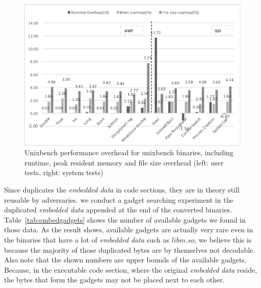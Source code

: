 \begin{figure}[h]
\begin{center}
\includegraphics[scale=0.52]{norax/figures/unixbench}
\caption{Unixbench performance overhead for unixbench binaries, including runtime, peak resident memory and file size overhead (left: user tests, right: system tests) }
\label{fig:unixbench}
\end{center}
\end{figure}

Since \norax duplicates the \emph{embedded data} in code sections, they are in theory still reusable by adversaries. we conduct a gadget searching experiment in the duplicated \emph{embedded data} appended at the end of the converted binaries. Table~\ref{tab:embedgadgets} shows the number of available gadgets we found in those data. As the result shows, available gadgets are actually very rare even in the binaries that have a lot of \emph{embedded data} such as $libm.so$, we believe this is because the majority of those duplicated bytes are by themselves not decodable. Also note that the shown numbers are upper bounds of the available gadgets. Because, in the executable code section, where the original \emph{embedded data} reside, the bytes that form the gadgets may not be placed next to each other.

